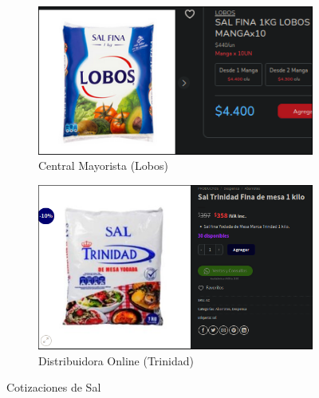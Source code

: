 \documentclass[12pt]{article}
\begin{document}
    \begin{figure}[H]
        \centering
        \begin{subfigure}{0.48\textwidth}
            \centering
            \includegraphics[width=\linewidth]{lobos} %
            \caption{Central Mayorista (Lobos)}
            \label{fig:central_mayorista_sal}
        \end{subfigure}
        \hfill
        \begin{subfigure}{0.48\textwidth}
            \centering
            \includegraphics[width=\linewidth]{online} %
            \caption{Distribuidora Online (Trinidad)}
            \label{fig:distribuidora_online_sal}
        \end{subfigure}
        \caption{Cotizaciones de Sal}
        \label{fig:cotizaciones_sal}
    \end{figure}
\end{document}
